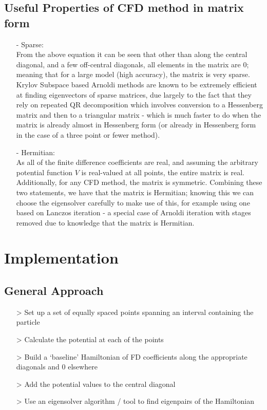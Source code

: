 \subsection{Useful Properties of CFD method in matrix form}
\begin{itemize}
	\item[-]Sparse: \\ From the above equation it can be seen that other than along the central diagonal, and a few off-central diagonals, all elements in the matrix are $0$; meaning that for a large model (high accuracy), the matrix is very sparse. Krylov Subspace based Arnoldi methods are known to be extremely efficient at finding eigenvectors of sparse matrices, due largely to the fact that they rely on repeated QR decomposition\cite{SAAD} which involves conversion to a Hessenberg matrix and then to a triangular matrix - which is much faster to do when the matrix is already almost in Hessenberg form (or already in Hessenberg form in the case of a three point or fewer method).
\item[-]Hermitian: \\ As all of the finite difference coefficients are real, and assuming the arbitrary potential function $V$ is real-valued at all points, the entire matrix is real. Additionally, for any CFD method, the matrix is symmetric. Combining these two statements, we have that the matrix is Hermitian; knowing this we can choose the eigensolver carefully to make use of this, for example using one based on Lanczos iteration - a special case of Arnoldi iteration with stages removed due to knowledge that the matrix is Hermitian.
\end{itemize}

\section{Implementation}
\subsection{General Approach}
\begin{itemize}
    \item[>]{Set up a set of equally spaced points spanning an interval containing the particle}
    \item[>]{Calculate the potential at each of the points}
    \item[>]{Build a `baseline' Hamiltonian of FD coefficients along the appropriate diagonals and $0$ elsewhere}
    \item[>]{Add the potential values to the central diagonal}
    \item[>]{Use an eigensolver algorithm / tool to find eigenpairs of the Hamiltonian}
\end{itemize}

